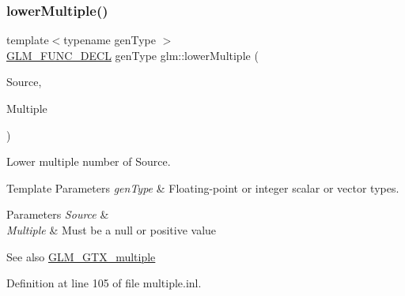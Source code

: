 \subsubsection{\texorpdfstring{lower\+Multiple()}{lowerMultiple()}}
{\footnotesize\ttfamily template$<$typename gen\+Type $>$ \\
\hyperlink{setup_8hpp_ab2d052de21a70539923e9bcbf6e83a51}{G\+L\+M\+\_\+\+F\+U\+N\+C\+\_\+\+D\+E\+CL} gen\+Type glm\+::lower\+Multiple (\begin{DoxyParamCaption}\item[{gen\+Type const \&}]{Source,  }\item[{gen\+Type const \&}]{Multiple }\end{DoxyParamCaption})}

Lower multiple number of Source.


\begin{DoxyTemplParams}{Template Parameters}
{\em gen\+Type} & Floating-\/point or integer scalar or vector types. \\
\hline
\end{DoxyTemplParams}

\begin{DoxyParams}{Parameters}
{\em Source} & \\
\hline
{\em Multiple} & Must be a null or positive value\\
\hline
\end{DoxyParams}
\begin{DoxySeeAlso}{See also}
\hyperlink{group__gtx__multiple}{G\+L\+M\+\_\+\+G\+T\+X\+\_\+multiple} 
\end{DoxySeeAlso}


Definition at line 105 of file multiple.\+inl.

